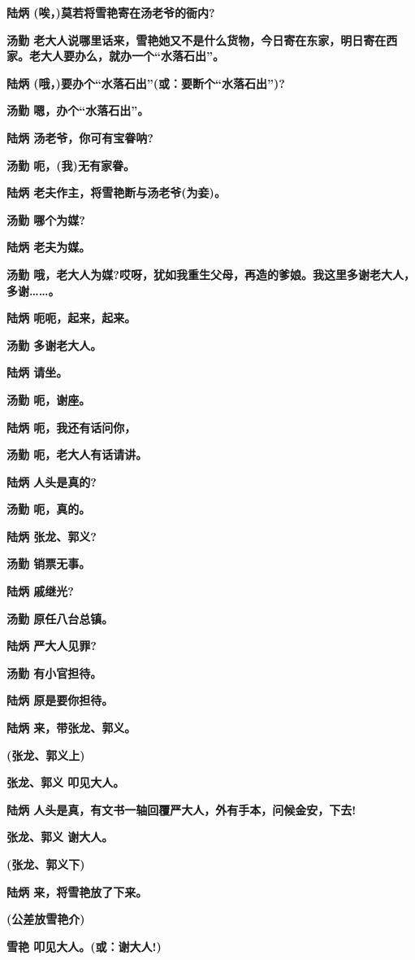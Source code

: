 \textbf{陆炳 (唉，)莫若将雪艳寄在汤老爷的衙内?}

\textbf{汤勤
老大人说哪里话来，雪艳她又不是什么货物，今日寄在东家，明日寄在西家。老大人要办么，就办一个``水落石出''。}

\textbf{陆炳 (哦，)要办个``水落石出''(或：要断个``水落石出'')?}

\textbf{汤勤 嗯，办个``水落石出''。}

\textbf{陆炳 汤老爷，你可有宝眷呐?}

\textbf{汤勤 呃，(我)无有家眷。}

\textbf{陆炳 老夫作主，将雪艳断与汤老爷(为妾)。}

\textbf{汤勤 哪个为媒?}

\textbf{陆炳 老夫为媒。}

\textbf{汤勤
哦，老大人为媒?哎呀，犹如我重生父母，再造的爹娘。我这里多谢老大人，多谢\ldots{}\ldots{}。}

\textbf{陆炳 呃呃，起来，起来。}

\textbf{汤勤 多谢老大人。}

\textbf{陆炳 请坐。}

\textbf{汤勤 呃，谢座。}

\textbf{陆炳 呃，我还有话问你，}

\textbf{汤勤 呃，老大人有话请讲。}

\textbf{陆炳 人头是真的?}

\textbf{汤勤 呃，真的。}

\textbf{陆炳 张龙、郭义?}

\textbf{汤勤 销票无事。}

\textbf{陆炳 戚继光?}

\textbf{汤勤 原任八台总镇。}

\textbf{陆炳 严大人见罪?}

\textbf{汤勤 有小官担待。}

\textbf{陆炳 原是要你担待。}

\textbf{陆炳 来，带张龙、郭义。}

\textbf{(张龙、郭义上)}

\textbf{张龙、郭义 叩见大人。}

\textbf{陆炳 人头是真，有文书一轴回覆严大人，外有手本，问候金安，下去!}

\textbf{张龙、郭义 谢大人。}

\textbf{(张龙、郭义下)}

\textbf{陆炳 来，将雪艳放了下来。}

\textbf{(公差放雪艳介)}

\textbf{雪艳 叩见大人。(或：谢大人!)}

